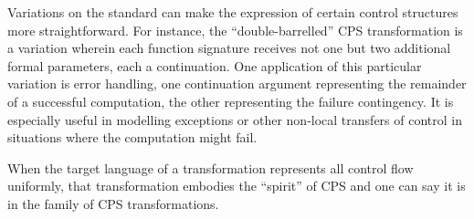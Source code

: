 \documentclass[ms]{byuprop}
\newcounter{definition}
\begin{document}
Variations on the standard can make the expression of certain control structures more 
straightforward. For instance, the ``double-barrelled'' CPS transformation is a 
variation wherein each function signature receives not one but two additional formal 
parameters, each a continuation. One application of this particular variation is 
error handling, one continuation argument representing the remainder of a successful 
computation, the other representing the failure contingency. It is especially useful 
in modelling exceptions or other non-local transfers of control in situations where 
the computation might fail.












 When the target language of a transformation represents all control flow uniformly, that transformation embodies the ``spirit'' of CPS \cite{sabry1994formal} and one can say it is in the family of CPS transformations.
\end{document}

